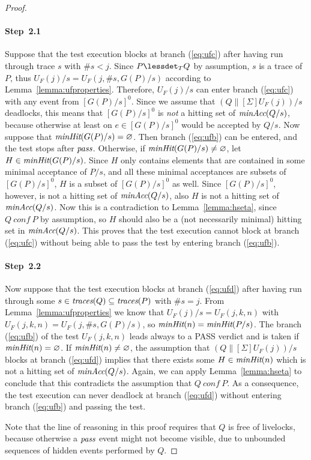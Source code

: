 \begin{proof}{~}
\paragraph{Step~2.1} Suppose that the test execution blocks at branch (\ref{eq:ufc})
after having run through trace $s$ with $\#s < j$. 
Since  $P\lessdet_T Q$ by assumption, $s$ is a trace of $P$, thus 
$U_F(j)/s = U_F(j,\#s,G(P)/s)$ according to Lemma~\ref{lemma:ufproperties}. Therefore,
$U_F(j)/s$  can enter  branch (\ref{eq:ufc}) with any event from $[G(P)/s]^0$.
Since we assume that $(Q\parallel[\Sigma] U_F(j))/s$ deadlocks, this means that
$[G(P)/s]^0$ is {\it not} a hitting set of $\text{\it minAcc}(Q/s)$, because otherwise at least
on $e\in [G(P)/s]^0$ would be accepted by $Q/s$. Now suppose that $\text{\it minHit}(G(P)/s) = \varnothing$. Then   branch (\ref{eq:ufb}) can be entered, and the test 
stops after ${\text{\it pass}}$. Otherwise, if $\text{\it minHit}(G(P)/s) \neq \varnothing$, let
$H\in\text{\it minHit}(G(P)/s)$. Since $H$ only contains elements that are contained in some minimal acceptance of $P/s$, and all these minimal acceptances are subsets of 
$[G(P)/s]^0$, $H$ is a subset of $[G(P)/s]^0$ as well. Since $[G(P)/s]^0$, however, 
is not a hitting set of $\text{\it minAcc}(Q/s)$, also $H$ is not a hitting set of 
$\text{\it minAcc}(Q/s)$.
Now this is a contradiction to Lemma~\ref{lemma:hseta}, since $Q\ conf\ P$ by assumption,
so $H$ should also be a (not necessarily minimal) hitting set in $\text{\it minAcc}(Q/s)$.
This proves that the test execution cannot block  at branch (\ref{eq:ufc})
without being able to pass the test by entering branch (\ref{eq:ufb}).

\paragraph{Step~2.2} Now suppose that the test execution blocks at 
branch (\ref{eq:ufd}) after having run through some $s\in\text{\it traces}(Q)\subseteq \text{\it traces}(P)$
with $\#s = j$.
From Lemma~\ref{lemma:ufproperties} we know
that $U_F(j)/s = U_F(j,k,n)$ with $U_F(j,k,n) = U_F(j,\#s,G(P)/s)$, so
$\text{\it minHit}(n) = \text{\it minHit}(P/s)$. The branch (\ref{eq:ufb}) of the test
$U_F(j,k,n)$ leads always to a PASS verdict and is taken if $\text{\it minHit}(n) =
\varnothing$. 
If $\text{\it minHit}(n) \neq \varnothing$,  the assumption that $(Q\parallel[\Sigma] U_F(j))/s$
blocks at branch (\ref{eq:ufd}) implies that there exists some $H\in\text{\it minHit}(n)$
which is not a hitting set of $\text{\it minAcc}(Q/s)$. Again, we can apply Lemma~\ref{lemma:hseta}
to conclude that this contradicts the assumption that $Q\ conf\ P$. As a consequence,
the test execution can never deadlock at branch (\ref{eq:ufd}) without entering
branch (\ref{eq:ufb}) and passing the test. 


Note that the line of reasoning in this proof requires that $Q$ is free of
livelocks, because otherwise a ${\text{\it pass}}$ event might not become visible,
due to unbounded sequences of hidden events performed by $Q$. 
\xbox
\end{proof}
